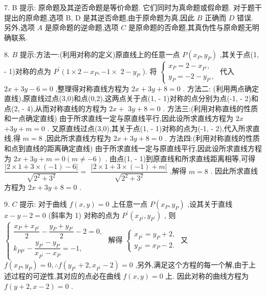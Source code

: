 7. B 提示: 原命题及其逆否命题是等价命题. 它们同时为真命题或假命题. 对于题干提出的原命题,选项 B, D 是其逆否命题,由于原命题为真,因此 $B$ 正确而 $D$ 错误. 另外,选项 $A$ 是原命题的逆命题,选项 $C$ 是原命题的否命题,其真伪性与原命题无明确联系.

8. $B$ 提示:方法一:(利用对称的定义)原直线上的任意一点 $P\left( {{x}_{P},{y}_{P}}\right)$ ,其关于点(1, - 1)对称的点为 ${P}^{\prime }\left( {1 \times  2 - {x}_{P}}\right. , - 1 \times$  $2 - {y}_{P}$ ). 将 $\left\{  \begin{array}{l} {x}_{P} = 2 - {x}_{{P}^{\prime }}, \\  {y}_{P} =  - 2 - {y}_{{P}^{\prime }}, \end{array}\right.$ 代入 ${2x} + {3y} - 6 = 0$ ,整理得对称直线方程为 ${2x} + {3y} + 8 = 0$ . 方法二: (利用两点确定直线),原直线过点(3,0)和点(0,2),这两点关于点(1, - 1)对称的点分别为点(-1, - 2)和点(2, - 4),从而对称直线的方程为 ${2x} +$  ${3y} + 8 = 0$ . 方法三:(利用对称直线的性质和一点确定直线) 由于所求直线一定与原直线平行,因此设所求直线方程为 ${2x}$  $+ {3y} + m = 0$ . 又原直线过点(3,0),其关于点(1, - 1)对称的点为(-1, - 2),代入所求直线,得 $m = 8$ ,因此所求直线方程为 ${2x} + {3y} + 8 = 0$ . 方法四:(利用对称直线的性质和点到直线的距离确定直线) 由于所求直线一定与原直线平行,因此设所求直线方程为 ${2x} + {3y} + m = 0\left( {m \neq   - 6}\right)$ . 由点(1, - 1)到原直线和所求直线距离相等,可得 $\dfrac{\left| 2 \times  1 + 3 \times  \left( -1\right)  - 6\right| }{\sqrt{{2}^{2} + {3}^{2}}} =$  $\dfrac{\left| 2 \times  1 + 3 \times  \left( -1\right)  + m\right| }{\sqrt{{2}^{2} + {3}^{2}}}$ ,解得 $m = 8$ . 因此所求直线方程为 ${2x} + {3y} + 8 = 0$ .

9. $C$ 提示: 对于曲线 $f\left( {x,y}\right)  = 0$ 上任意一点 $P\left( {{x}_{P},{y}_{P}}\right)$ ,设其关于直线 $x - y - 2 = 0$ (斜率为 1) 对称的点为 ${P}^{\prime }\left( {{x}_{{P}^{\prime }},{y}_{{P}^{\prime }}}\right)$ , 则 $\left\{  \begin{array}{l} \dfrac{{x}_{P} + {x}_{{P}^{\prime }}}{2} - \dfrac{{y}_{P} + {y}_{{P}^{\prime }}}{2} - 2 = 0, \\  {k}_{P{P}^{\prime }} - \dfrac{{y}_{{P}^{\prime }} - {y}_{P}}{{x}_{{P}^{\prime }} - {x}_{P}} =  - 1, \end{array}\right.$ 解得 $\left\{  \begin{array}{l} {x}_{{P}^{\prime }} = {y}_{P} + 2, \\  {y}_{{P}^{\prime }} = {x}_{P} - 2. \end{array}\right.$ 又 $f\left( {{x}_{P},{y}_{P}}\right)  = 0,\therefore f\left( {{y}_{{P}^{\prime }} + 2,{x}_{{P}^{\prime }} - 2}\right)  = 0$ ,另外,满足这个方程的每一个解,由于上述过程的可逆性,其对应的点必在曲线 $f\left( {x,y}\right)  = 0$ 上. 因此对称的曲线方程为 $f\left( {y + 2,x - 2}\right)  = 0$ .

